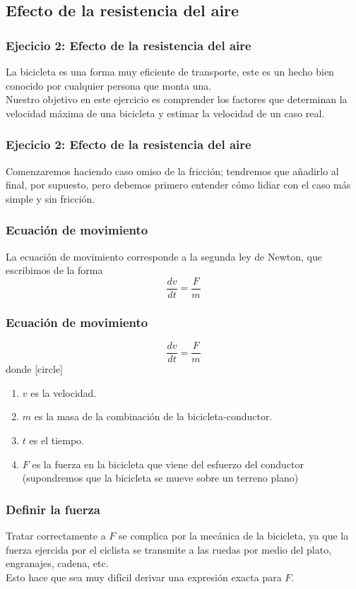 \subsection{Efecto de la resistencia del aire}
\begin{frame}
\frametitle{Ejecicio 2: Efecto de la resistencia del aire}
La bicicleta es una forma muy eficiente de transporte, este es un hecho bien conocido por cualquier persona que monta una. 
\\
\bigskip
Nuestro objetivo en este ejercicio es comprender los factores que determinan la velocidad máxima de una bicicleta y estimar la velocidad de un caso real.
\end{frame}
\begin{frame}
\frametitle{Ejecicio 2: Efecto de la resistencia del aire}
Comenzaremos haciendo caso omiso de la fricción; tendremos que añadirlo al final, por supuesto, pero debemos primero entender cómo lidiar con el caso más simple y sin fricción.
\end{frame}
\begin{frame}
\frametitle{Ecuación de movimiento}
La ecuación de movimiento corresponde a la segunda ley de Newton, que escribimos de la forma
\begin{equation}\label{EqNewton2}
\dfrac{dv}{dt} = \dfrac{F}{m}
\end{equation}
\end{frame}
\begin{frame}
\frametitle{Ecuación de movimiento}
\begin{equation*}
\dfrac{dv}{dt} = \dfrac{F}{m}
\end{equation*}
donde
[circle]
\begin{enumerate}[<+->]
\item $v$ es la velocidad.
\item $m$ es la masa de la combinación de la bicicleta-conductor.
\item $t$ es el tiempo.
\item $F$ es la fuerza en la bicicleta que viene del esfuerzo del conductor (supondremos que la bicicleta se mueve sobre un terreno plano)
\end{enumerate}
\end{frame}
\begin{frame}
\frametitle{Definir la fuerza}
Tratar correctamente a $F$ se complica por la mecánica de la bicicleta, ya que la fuerza ejercida por el ciclista se transmite a las ruedas por medio del plato, engranajes, cadena, etc.
\\
\medskip
Esto hace que sea muy difícil derivar una expresión exacta para $F$.
\end{frame}
